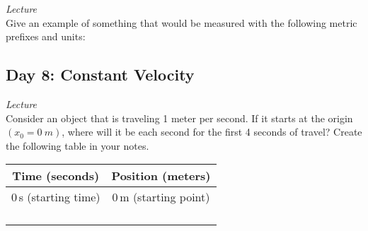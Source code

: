 \documentclass[dvipsnames]{exam}
\begin{document}
\begin{questions}

\question
\textit{Lecture}\\
Give an example of something that would be measured with the following metric prefixes and units:


\subsection*{Day 8: Constant Velocity}

\question \label{nTMKE}
\textit{Lecture}\\
Consider an object that is traveling 1 meter per second. 
If it starts at the origin $(x_0 = \SI{0}{m})$, where will it be each second for the first 4 seconds of travel? Create the following table in your notes.

\begin{center}
    \begin{tabular}{|c|c|}
        \hline
         \textbf{Time (seconds)} & \textbf{Position (meters)} \\ \hline
         0\,s (starting time) & 0\,m (starting point) \\ \hline
         & \\ \hline
         & \\ \hline
         & \\ \hline
         & \\ \hline
    \end{tabular}
\end{center}


\end{questions}
\end{document}
